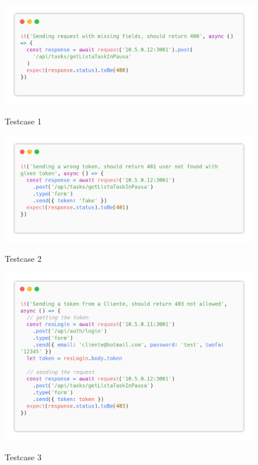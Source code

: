 \documentclass{report}
\begin{document}
\begin{figure}[H]
	\centering\includegraphics[width=1\textwidth]{images/code_in_pausa_test1.png}

	Testcase 1
\end{figure}
\begin{figure}[H]
	\centering\includegraphics[width=1\textwidth]{images/code_in_pausa_test2.png}

	Testcase 2
\end{figure}
\begin{figure}[H]
	\centering\includegraphics[width=1\textwidth]{images/code_in_pausa_test3.png}

	Testcase 3
\end{figure}
\end{document}
